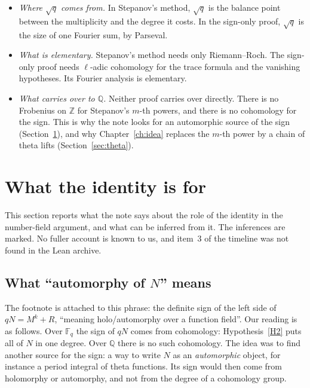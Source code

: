 \documentclass[11pt]{amsbook}
\theoremstyle{plain}
\theoremstyle{definition}
\theoremstyle{remark}
\numberwithin{equation}{section}
\numberwithin{figure}{chapter}
\numberwithin{table}{chapter}
\newcommand{\Q}{\mathbb{Q}}
\newcommand{\Z}{\mathbb{Z}}
\newcommand{\F}{\mathbb{F}}
\begin{document}
\begin{itemize}
\item \emph{Where $\sqrt q$ comes from.} In Stepanov's method,
  $\sqrt q$ is the balance point between the multiplicity and the
  degree it costs. In the sign-only proof, $\sqrt q$ is the size of
  one Fourier sum, by Parseval.
\item \emph{What is elementary.} Stepanov's method needs only
  Riemann--Roch. The sign-only proof needs $\ell$-adic cohomology
  for the trace formula and the vanishing hypotheses. Its Fourier
  analysis is elementary.
\item \emph{What carries over to $\Q$.} Neither proof carries over
  directly. There is no Frobenius on $\Z$ for Stepanov's $m$-th
  powers, and there is no cohomology for the sign. This is why the
  note looks for an automorphic source of the sign
  (Section~\ref{sec:role}), and why
  Chapter~\ref{ch:idea} replaces the $m$-th power by a chain of
  theta lifts (Section~\ref{sec:theta}).
\end{itemize}

\section{What the identity is for}\label{sec:role}

This section reports what the note says about the role of the
identity in the number-field argument, and what can be inferred
from it. The inferences are marked. No fuller account is known to
us, and item~3 of the timeline was not found in the Lean archive.

\subsection{What ``automorphy of $N$'' means}

The footnote is attached to this phrase: the definite sign of the
left side of $qN = M^k + R$, ``meaning holo/automorphy over a
function field''. Our reading is as follows. Over $\F_q$ the sign
of $qN$ comes from cohomology: Hypothesis~\ref{H2} puts all of $N$
in one degree. Over $\Q$ there is no such cohomology. The idea was
to find another source for the sign: a way to write $N$ as an
\emph{automorphic} object, for instance a period integral of theta
functions. Its sign would then come from holomorphy or automorphy,
and not from the degree of a cohomology group.
\end{document}
